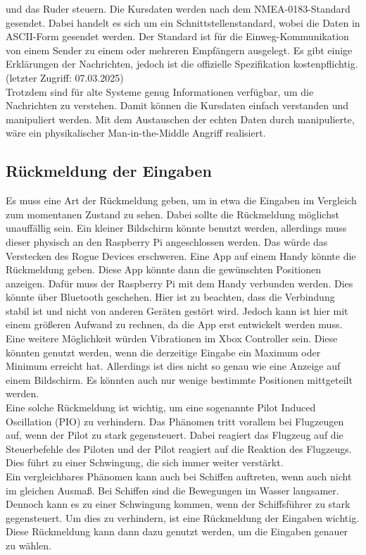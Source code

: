 und das Ruder steuern. Die Kursdaten werden nach dem NMEA-0183-Standard gesendet. Dabei handelt es sich um ein Schnittstellenstandard, 
wobei die Daten in ASCII-Form gesendet werden. Der Standard ist für die Einweg-Kommunikation von einem Sender zu einem oder mehreren
Empfängern ausgelegt. Es gibt einige Erklärungen der Nachrichten, jedoch ist die offizielle Spezifikation kostenpflichtig. 
\cite{nmea0183} (letzter Zugriff: 07.03.2025)\\
Trotzdem sind für alte Systeme genug Informationen verfügbar, um die Nachrichten zu verstehen. Damit können die Kursdaten
einfach verstanden und manipuliert werden. Mit dem Austauschen der echten Daten durch manipulierte, wäre ein 
physikalischer Man-in-the-Middle Angriff realisiert.\\

\subsection{Rückmeldung der Eingaben}
Es muss eine Art der Rückmeldung geben, um in etwa die Eingaben im Vergleich zum momentanen Zustand zu sehen.
Dabei sollte die Rückmeldung möglichst unauffällig sein. Ein kleiner Bildschirm könnte benutzt werden, allerdings
muss dieser physisch an den Raspberry Pi angeschlossen werden. Das würde das Verstecken des Rogue Devices erschweren.
Eine App auf einem Handy könnte die Rückmeldung geben. Diese App könnte dann die gewünschten Positionen anzeigen.
Dafür muss der Raspberry Pi mit dem Handy verbunden werden. Dies könnte über Bluetooth geschehen.
Hier ist zu beachten, dass die Verbindung stabil ist und nicht von anderen Geräten gestört wird.
Jedoch kann ist hier mit einem größeren Aufwand zu rechnen, da die App erst entwickelt werden muss.
Eine weitere Möglichkeit würden Vibrationen im Xbox Controller sein. Diese könnten genutzt werden, wenn die derzeitige
Eingabe ein Maximum oder Minimum erreicht hat. Allerdings ist dies nicht so genau wie eine Anzeige auf einem Bildschirm.
Es könnten auch nur wenige bestimmte Positionen mittgeteilt werden. \\
Eine solche Rückmeldung ist wichtig, um eine sogenannte Pilot Induced Oscillation (PIO) zu verhindern. Das Phänomen tritt
vorallem bei Flugzeugen auf, wenn der Pilot zu stark gegensteuert. Dabei reagiert das Flugzeug auf die Steuerbefehle
des Piloten und der Pilot reagiert auf die Reaktion des Flugzeugs. Dies führt zu einer Schwingung, die sich immer weiter
verstärkt. \cite{McRuer1995} \\
Ein vergleichbares Phänomen kann auch bei Schiffen auftreten, wenn auch nicht im gleichen Ausmaß. Bei Schiffen 
sind die Bewegungen im Wasser langsamer. Dennoch kann es zu einer Schwingung kommen, wenn der Schiffsführer
zu stark gegensteuert. Um dies zu verhindern, ist eine Rückmeldung der Eingaben wichtig. Diese Rückmeldung kann dann
dazu genutzt werden, um die Eingaben genauer zu wählen.